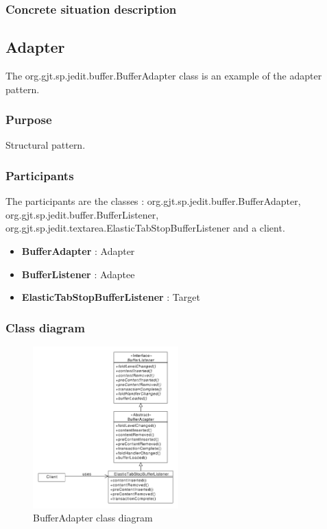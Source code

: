 \documentclass[a4paper,10pt]{article}
\begin{document}
\subsubsection{Concrete situation description}


\newpage
\subsection{Adapter}
The org.gjt.sp.jedit.buffer.BufferAdapter class is an example of the adapter pattern.

\subsubsection{Purpose}
Structural pattern.
\subsubsection[Participants]{Participants\footnotemark[1]}
The participants are the classes : org.gjt.sp.jedit.buffer.BufferAdapter, org.gjt.sp.jedit.buffer.BufferListener, org.gjt.sp.jedit.textarea.ElasticTabStopBufferListener and a client.
\begin{itemize}
 \item \textbf{BufferAdapter} : Adapter
 \item \textbf{BufferListener} : Adaptee
 \item \textbf{ElasticTabStopBufferListener} : Target
\end{itemize}

\subsubsection{Class diagram}
\begin{center}
\begin{figure}[h]
  \centerline{\includegraphics[width=0.5\textwidth]{adapter-bufferadapter-class-diagram.pdf}}
  \caption{BufferAdapter class diagram}
\end{figure}
\end{center}
\end{document}
